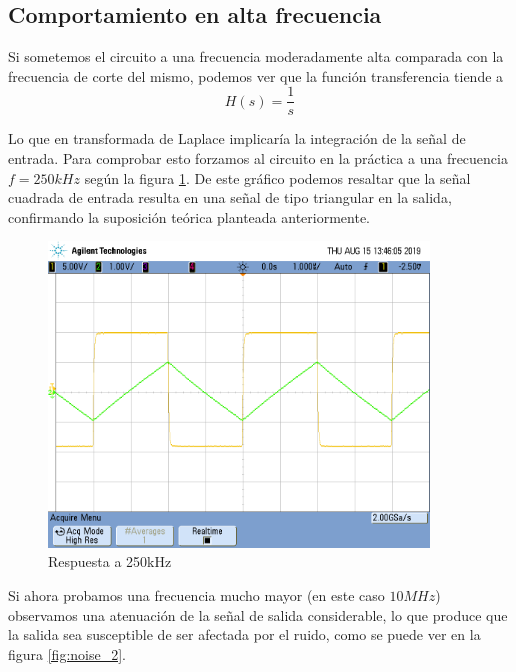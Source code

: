 \subsection{Comportamiento en alta frecuencia}

\quad \quad Si sometemos el circuito a una frecuencia moderadamente alta comparada con la frecuencia de corte del mismo, podemos ver que la funci\'on transferencia tiende a 
\begin{equation}\label{integrador_2}
    H(s)=\frac{1}{s}
\end{equation}

Lo que en transformada de Laplace implicar\'ia la integraci\'on de la se\~nal de entrada. Para comprobar esto forzamos al circuito en la pr\'actica a una frecuencia $f=250kHz$ seg\'un la figura \ref{fig:altafrec_2}. De este gr\'afico podemos resaltar que la se\~nal cuadrada de entrada resulta en una se\~nal de tipo triangular en la salida, confirmando la suposici\'on te\'orica planteada anteriormente.

\begin{figure}[H]
    \centering
    \includegraphics[width=0.9\textwidth]{./EJ2/EJ2_integrador.png}
    \caption{Respuesta a 250kHz}
    \label{fig:altafrec_2} 
\end{figure}

\quad \quad Si ahora probamos una frecuencia mucho mayor (en este caso $10MHz$) observamos una atenuaci\'on de la se\~nal de salida considerable, lo que produce que la salida sea susceptible de ser afectada por el ruido, como se puede ver en la figura \ref{fig:noise_2}.
 
